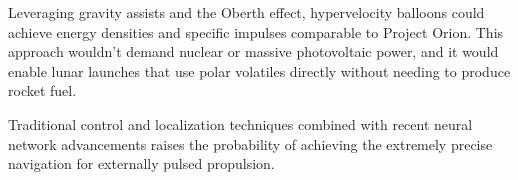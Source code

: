 \documentclass{article}
\begin{document}
Leveraging gravity assists and the Oberth effect, hypervelocity balloons could achieve energy densities and specific impulses comparable to Project Orion. This approach wouldn't demand nuclear or massive photovoltaic power, and it would enable lunar launches that use polar volatiles directly without needing to produce rocket fuel.     

Traditional control and localization techniques combined with recent neural network advancements raises the probability of achieving the extremely precise navigation for externally pulsed propulsion.



  
  
\end{document}
